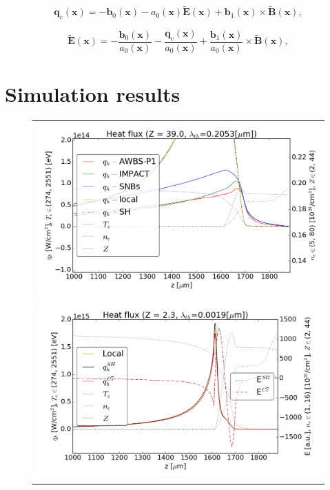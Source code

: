 \documentclass[preprint,12pt]{elsarticle}
\newcommand{\vect}[1]{\boldsymbol{#1}}
\newcommand{\tE}{\vect{\tilde{E}}}
\newcommand{\tB}{\vect{\tilde{B}}}
\begin{document}
\begin{equation}
  \vect{q}_c(\vect{x}) 
  = -\vect{b}_{0}(\vect{x}) 
  - a_{0}(\vect{x})\tE(\vect{x})
   + \vect{b}_{1}(\vect{x})\times\tB(\vect{x}) ,
  \label{eq:OOE_HOFcurrent}
\end{equation}

\begin{equation}
  \tE(\vect{x}) = -\frac{\vect{b}_{0}(\vect{x})}{a_{0}(\vect{x})} 
  - \frac{\vect{q}_c(\vect{x})}{a_{0}(\vect{x})}
   + \frac{\vect{b}_{1}(\vect{x})}{a_{0}(\vect{x})}\times\tB(\vect{x}) ,
  \label{eq:OOE_HOFcurrent}
\end{equation}


\section{Simulation results}\label{sec:results}
\begin{figure}[tbh]
  \begin{center}
    \begin{tabular}{c}
      \includegraphics[width=1.0\textwidth]{../VFPdata/GD_Hohlraum/fluxes_10ps.png} \\
      \includegraphics[width=1.0\textwidth]{../VFPdata/GD_Hohlraum/diffusion_fluxes_Efield_10ps.png} 
    \end{tabular}
  \caption{
  }
  \end{center}
  \label{fig:AWBScorrection_f1}
\end{figure}
\end{document}
